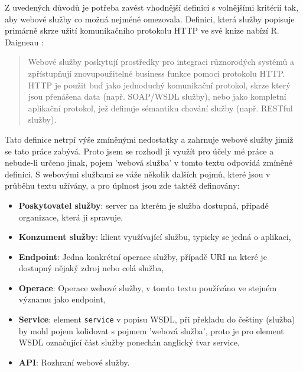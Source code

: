 \documentclass[czech,DP]{thesiskiv}
\begin{document}
Z uvedených důvodů je potřeba zavést vhodnější definici s volnějšími kritérii tak, aby webové služby co možná nejméně omezovala. Definici, která služby popisuje primárně skrze užití komunikačního protokolu HTTP ve své knize nabízí R. Daigneau  \cite{fromObjectsToWs}: 

\begin{quote}
	Webové služby poskytují prostředky pro integraci různorodých systémů a zpřístupňují znovupoužitelné business funkce pomocí protokolu HTTP. HTTP je použit buď jako jednoduchý komunikační protokol, skrze který jsou přenášena data (např. SOAP/WSDL služby), nebo jako kompletní aplikační protokol, jež definuje sémantiku chování služby (např. RESTful služby).
\end{quote}

Tato definice netrpí výše zmíněnými nedostatky a zahrnuje webové služby jimiž se tato práce zabývá. Proto jsem se rozhodl ji využít pro účely mé práce a nebude-li určeno jinak, pojem 'webová služba' v tomto textu odpovídá zmíněné definici. S webovými službami se váže několik dalších pojmů, které jsou v průběhu textu užívány, a pro úplnost jsou zde taktéž definovány:


\begin{itemize}
	\item \textbf{Poskytovatel služby}: server na kterém je služba dostupná, případě organizace, která ji spravuje,
	\item \textbf{Konzument služby}: klient využívající službu, typicky se jedná o aplikaci,
	\item \textbf{Endpoint}: Jedna konkrétní operace služby, případě URI na které je dostupný nějaký zdroj nebo celá služba,
	\item \textbf{Operace}: Operace webové služby, v tomto textu používáno ve stejném významu jako endpoint,
	\item \textbf{Service}: element \verb|service| v popisu WSDL, při překladu do češtiny (služba) by mohl pojem kolidovat s pojmem 'webová služba', proto je pro element WSDL označující část služby ponechán anglický tvar service,
	\item \textbf{API}: Rozhraní webové služby.
\end{itemize}
\end{document}

